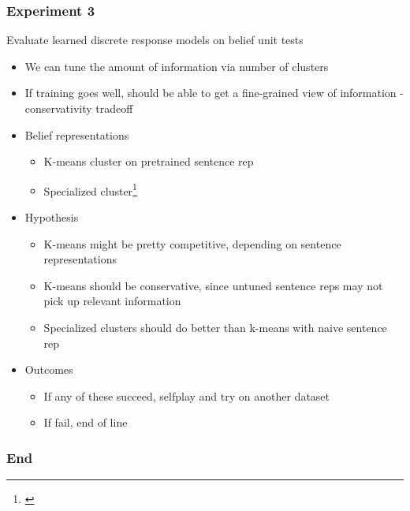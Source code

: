 \documentclass{beamer}
\begin{document}
\begin{frame}
\frametitle{Experiment 3}
Evaluate learned discrete response models on belief unit tests
\begin{itemize}
\item We can tune the amount of information via number of clusters
\item If training goes well, should be able to get a
    fine-grained view of information - conservativity tradeoff
\item Belief representations
    \begin{itemize}
    \item K-means cluster on pretrained sentence rep
    \item Specialized cluster\footnote{\citet{li}}
    \end{itemize}
\item Hypothesis
    \begin{itemize}
    \item K-means might be pretty competitive, depending on sentence representations
    \item K-means should be conservative, since untuned sentence reps may not
        pick up relevant information
    \item Specialized clusters should do better than k-means with naive sentence rep
    \end{itemize}
\item Outcomes
    \begin{itemize}
    \item If any of these succeed, selfplay and try on another dataset
    \item If fail, end of line
    \end{itemize}
\end{itemize}
\end{frame}


\begin{frame}
\frametitle{End}
\end{frame}
\end{document}
